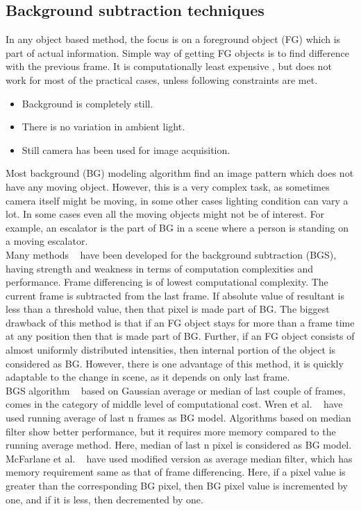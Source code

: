\subsection{Background subtraction techniques}
\indent In any object based method, the focus is on a foreground object
(FG) which is part of actual information. Simple way of getting FG
objects is to find difference with the previous frame. It is
computationally least expensive , but does not work for most of the
practical cases, unless following constraints are met.
\begin{itemize}
	\item Background is completely still.
	\item There is no variation in ambient light.
	\item Still camera has been used for image acquisition.
\end{itemize}
Most background (BG) modeling algorithm find an image pattern which does
not have any moving object. However, this is a very complex task, as
sometimes camera itself might be moving, in some other cases lighting
condition can vary a lot. In some cases even all the moving objects
might not be of interest. For example, an escalator is the part of BG in
a scene where a person is standing on a moving escalator.\\

\indent Many methods ~\cite{9, 10, 11, 12, 13, 14} have been developed
for the background subtraction (BGS), having strength and weakness in
terms of computation complexities and performance. Frame differencing is
of lowest computational complexity. The current frame is subtracted from
the last frame. If absolute value of resultant is less than a threshold
value, then that pixel is made part of BG.  The biggest drawback of this
method is that if an FG object stays for more than a frame time at any
position then that is made part of BG. Further, if an FG object consists
of almost uniformly distributed intensities, then internal portion of
the object is considered as BG. However, there is one advantage of this
method, it is quickly adaptable to the change in scene, as it depends on
only last frame.\\

\indent BGS algorithm ~\cite{10, 12, 13, 14, 15} based on Gaussian
average or median of last couple of frames, comes in the category of
middle level of computational cost. Wren et al. ~\cite{12} have used
running average of last n frames as BG model. Algorithms based on median
filter show better performance, but it requires more memory compared to
the running average method. Here, median of last n pixel is considered
as BG model.  McFarlane et al. ~\cite{14} have used modified version as
average median filter, which has memory requirement same as that of
frame differencing.  Here, if a pixel value is greater than the
corresponding BG pixel, then BG pixel value is incremented by one, and
if it is less, then decremented by one.\\


